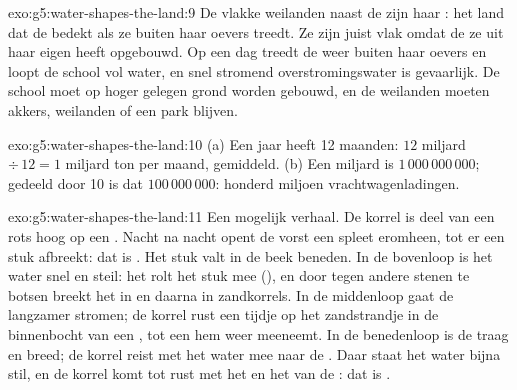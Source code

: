 \begin{solution}{exo:g5:water-shapes-the-land:9}
De vlakke weilanden naast de  zijn haar : het
land dat de  bedekt als ze buiten haar oevers treedt. Ze zijn juist
vlak omdat de  ze uit haar eigen  heeft opgebouwd. Op een dag
treedt de  weer buiten haar oevers en loopt de school vol water, en
snel stromend overstromingswater is gevaarlijk. De school moet op hoger
gelegen grond worden gebouwd, en de weilanden moeten akkers, weilanden of
een park blijven.
\end{solution}

\begin{solution}{exo:g5:water-shapes-the-land:10}
(a) Een jaar heeft 12 maanden: $12$ miljard $\div\, 12 = 1$ miljard ton per
maand, gemiddeld. (b) Een miljard is $1\,000\,000\,000$; gedeeld door 10 is
dat $100\,000\,000$: honderd miljoen vrachtwagenladingen.
\end{solution}

\begin{solution}{exo:g5:water-shapes-the-land:11}
Een mogelijk verhaal. De korrel is deel van een rots hoog op een .
Nacht na nacht opent de vorst een spleet eromheen, tot er een stuk 
afbreekt: dat is . Het stuk valt in de beek beneden. In de
bovenloop is het water snel en steil: het rolt het stuk mee (), en
door tegen andere stenen te botsen breekt het in  en daarna in
zandkorrels. In de middenloop gaat de  langzamer stromen; de korrel
rust een tijdje op het zandstrandje in de binnenbocht van een , tot
een  hem weer meeneemt. In de benedenloop is de  traag en
breed; de korrel reist met het water mee naar de . Daar staat het
water bijna stil, en de korrel komt tot rust met het  en het  van
de : dat is .
\end{solution}
